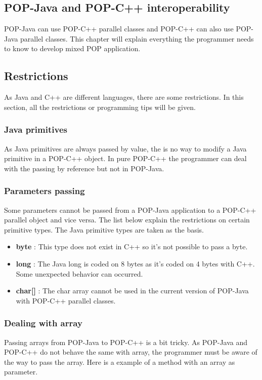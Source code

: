 \label{mixed}
\subsection{POP-Java and POP-C++ interoperability}
POP-Java can use POP-C++ parallel classes and POP-C++ can also use POP-Java parallel classes. This chapter will explain everything the programmer needs to know to develop mixed POP application. 


\subsection{Restrictions}
As Java and C++ are different languages, there are some restrictions. In this section, all the restrictions or programming tips will be given.

\subsubsection{Java primitives}
As Java primitives are always passed by value, the is no way to modify a Java primitive in a POP-C++ object. In pure POP-C++ the programmer can deal with the passing by reference but not in POP-Java.

\subsubsection{Parameters passing}
Some parameters cannot be passed from a POP-Java application to a POP-C++ parallel object and vice versa. The list below explain the restrictions on certain primitive types. The Java primitive types are taken as the basis.

\begin{itemize}
\item \textbf{byte} : This type does not exist in C++ so it's not possible to pass a byte.
\item \textbf{long} : The Java long is coded on 8 bytes as it's coded on 4 bytes with C++. Some unexpected behavior can occurred.
\item \textbf{char[]} : The char array cannot be used in the current version of POP-Java with POP-C++ parallel classes.
\end{itemize}

\subsubsection{Dealing with array}
Passing arrays from POP-Java to POP-C++ is a bit tricky. As POP-Java and POP-C++ do not behave the same with array, the programmer must be aware of the way to pass the array. Here is a example of a method with an array as parameter.\s

